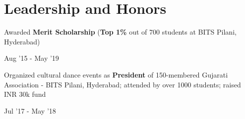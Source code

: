 \documentclass[]{Resume}
\begin{document}
\section{Leadership and Honors} 
\hrulefill 

\begin{minipage}[t]{.8\textwidth}
	\pt Awarded \textbf{Merit Scholarship} (\textbf{Top 1\%} out of 700 students at BITS Pilani, Hyderabad)
\end{minipage}%
\begin{minipage}[t]{.2\textwidth}
	\hfill Aug '15 - May '19
\end{minipage}

\begin{minipage}[t]{.8\textwidth}
	\pt Organized cultural dance events as \textbf{President} of 150-membered Gujarati Association - BITS Pilani, Hyderabad; attended by over 1000 students; raised INR 30k fund
\end{minipage}%
\begin{minipage}[t]{.2\textwidth}
	\hfill Jul '17 - May '18
\end{minipage}


\end{document}
